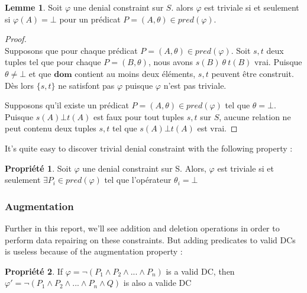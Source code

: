 \documentclass[letterpaper, 12pt]{report}
\theoremstyle{definition}
\newtheorem{myprop}{Propriété}
\newtheorem{mylemma}{Lemme}
\newcommand{\dom}{\mathbf{dom}}
\newcommand{\alinea}{
\hspace*{0.5cm}}
\begin{document}
\begin{mylemma}
Soit $\varphi$ une denial constraint sur $S$. alors $\varphi$ est triviale si et seulement si $\varphi(A) = \bot$ pour un prédicat $P=(A,\theta) \in pred(\varphi)$.
\end{mylemma}
\begin{proof}
~\\
\alinea \framebox{$\implies$}
Supposons que pour chaque prédicat $P=(A,\theta) \in pred(\varphi)$. Soit $s,t$ deux tuples tel que pour chaque $P=(B,\theta)$, nous avons $s(B)\ \theta\ t(B)$ vrai.
Puisque $\theta \neq \bot$ et que $\dom$ contient au moins deux éléments, $s,t$ peuvent être construit. Dès lors $\{s,t\}$ ne satisfont pas $\varphi$ puisque $\varphi$ n'est pas triviale.

\framebox{$\impliedby$}
Supposons qu'il existe un prédicat $P=(A,\theta) \in pred (\varphi)$ tel que $\theta = \bot$.
Puisque $s(A) \bot t(A)$ est faux pour tout tuples $s,t$ sur $S$, aucune relation ne peut contenu deux tuples $s,t$ tel que $s(A) \bot t(A)$ est vrai.
\end{proof}

It's quite easy to discover trivial denial constraint with the following property \cite{DCs}:

\begin{myprop}
\label{trivialprop}
Soit $\varphi$ une denial constraint sur S. Alors, $\varphi$ est triviale si et seulement $\exists P_i \in pred(\varphi)$ tel que l'opérateur $\theta_i = \bot$ 
\end{myprop}




\subsubsection{Augmentation}

Further in this report, we'll see addition and deletion operations in order to perform data repairing on these constraints. But adding predicates to valid DCs is useless because of the augmentation property \cite{DCs}:

\begin{myprop}
	If $\varphi = \neg (P_1 \wedge P_2 \wedge ... \wedge P_n)$ is a valid DC, then $\varphi ' = \neg(P_1 \wedge P_2 \wedge ... \wedge P_n \wedge Q)$ is also a valide DC
\end{myprop}

\end{document}
